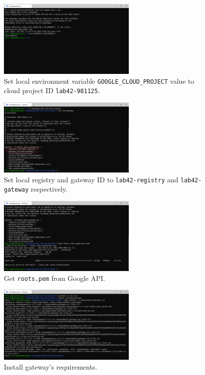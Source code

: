 \documentclass[12pt, a4paper, onside]{article}
\begin{document}
\begin{figure}[h]
  \centering
  \includegraphics[width=0.6\textwidth]{img/4_local_environment_variable}
  \caption{Set local environment variable \texttt{GOOGLE\_CLOUD\_PROJECT} value to cloud project ID \texttt{lab42-981125}.}
\end{figure}

\begin{figure}[h]
  \centering
  \includegraphics[width=0.6\textwidth]{img/5_local_gateway}
  \caption{Set local registry and gateway ID to \texttt{lab42-registry} and \texttt{lab42-gateway} respectively.}
\end{figure}

\begin{figure}[h]
  \centering
  \includegraphics[width=0.6\textwidth]{img/6_local_roots_pem}
  \caption{Get \texttt{roots.pem} from Google API.}
\end{figure}

\begin{figure}[h]
  \centering
  \includegraphics[width=0.6\textwidth]{img/7_local_install_gateway_requirements}
  \caption{Install gateway's requirements.}
\end{figure}
\end{document}
